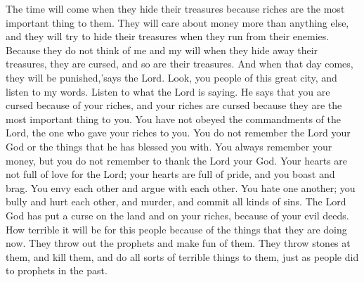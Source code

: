 The time will come when they hide their treasures because riches are the most important thing to them. They will care about money more than anything else, and they will try to hide their treasures when they run from their enemies. Because they do not think of me and my will when they hide away their treasures, they are cursed, and so are their treasures. And when that day comes, they will be punished,\rq says the Lord.
\bverse \iffalse Behold ye, the people of this great city, and hearken unto my words; yea, hearken unto the words which the Lord saith; for behold, he saith that ye are cursed because of your riches, and also are your riches cursed because ye have set your hearts upon them, and have not hearkened unto the words of him who gave them unto you. \fi
Look, you people of this great city, and listen to my words. Listen to what the Lord is saying. He says that you are cursed because of your riches, and your riches are cursed because they are the most important thing to you. You have not obeyed the commandments of the Lord, the one who gave your riches to you.
\bverse \iffalse Ye do not remember the Lord your God in the things with which he hath blessed you, but ye do always remember your riches, not to thank the Lord your God for them; yea, your hearts are not drawn out unto the Lord, but they do swell with great pride, unto boasting, and unto great swelling, envyings, strifes, malice, persecutions and murders, and all manner of iniquities. \fi
You do not remember the Lord your God or the things that he has blessed you with. You always remember your money, but you do not remember to thank the Lord your God. Your hearts are not full of love for the Lord; your hearts are full of pride, and you boast and brag. You envy each other and argue with each other. You hate one another; you bully and hurt each other, and murder, and commit all kinds of sins.
\bverse \iffalse For this cause hath the Lord God caused that a curse should come upon the land, and also upon your riches, and this because of your iniquities. \fi
The Lord God has put a curse on the land and on your riches, because of your evil deeds.
\bverse \iffalse Yea, wo unto this people, because of this time which has arrived, that ye do cast out the prophets, and do mock them, and cast stones at them, and do slay them, and do all manner of iniquity unto them, even as they did of old time. \fi
How terrible it will be for this people because of the things that they are doing now. They throw out the prophets and make fun of them. They throw stones at them, and kill them, and do all sorts of terrible things to them, just as people did to prophets in the past.
